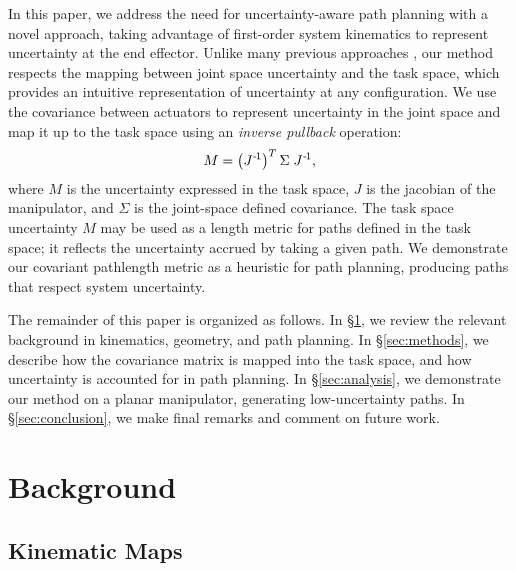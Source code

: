 \documentclass[10pt,conference]{ieeeconf}
\begin{document}
In this paper, we address the need for uncertainty-aware path planning with a novel approach, taking advantage of first-order system kinematics to represent uncertainty at the end effector.
Unlike many previous approaches \cite{previous work?}, our method respects the mapping between joint space uncertainty and the task space, which provides an intuitive representation of uncertainty at any configuration.
We use the covariance between actuators to represent uncertainty in the joint space and map it up to the task space using an \textit{inverse pullback} operation:
\begin{equation}
	M = \left(J^{\hspace{.1ex}\text{-}\hspace{-.2ex}1}\right)^T \Sigma \; J^{\hspace{.1ex}\text{-}\hspace{-.2ex}1},
\end{equation}
where $M$ is the uncertainty expressed in the task space, $J$ is the jacobian of the manipulator, and $\Sigma$ is the joint-space defined covariance.
The task space uncertainty $M$ may be used as a length metric for paths defined in the task space; it reflects the uncertainty accrued by taking a given path.
We demonstrate our covariant pathlength metric as a heuristic for path planning, producing paths that respect system uncertainty.

The remainder of this paper is organized as follows.
In \S\ref{sec:background}, we review the relevant background in kinematics, geometry, and path planning.
In \S\ref{sec:methods}, we describe how the covariance matrix is mapped into the task space, and how uncertainty is accounted for in path planning.
In \S\ref{sec:analysis}, we demonstrate our method on a planar manipulator, generating low-uncertainty paths.
In \S\ref{sec:conclusion}, we make final remarks and comment on future work.

\section{Background}\label{sec:background}
\subsection{Kinematic Maps}
\end{document}
